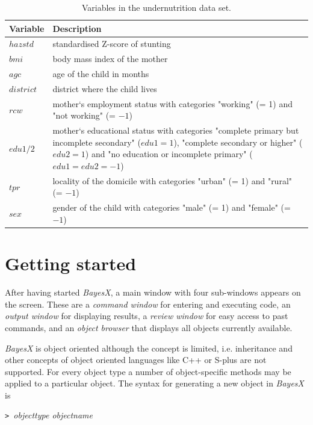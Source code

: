 \documentclass{article}
\begin{document}
{\footnotesize
\begin{table}[ht]
\begin{center}
\begin{tabular}{|l|p{12.5cm}|}
 \hline
 {\bf Variable} & {\bf Description}\\
 \hline
 $hazstd$ & standardised Z-score of stunting\\
 $bmi$ & body mass index of the mother\\
 $agc$ & age of the child in months\\
 $district$ & district where the child lives\\
 $rcw$ & mother`s employment status with categories "working" (= 1) and "not working" (= $-1$)\\
 $edu1/2$ & mother`s educational status with categories "complete primary but incomplete secondary" ($edu1=1$), "complete secondary or higher" ($edu2=1$) and "no education or incomplete primary" ($edu1=edu2=-1$)\\
 $tpr$ & locality of the domicile with categories "urban" (= 1) and "rural" (= $-1$)\\
 $sex$ & gender of the child with categories "male" (= 1) and
 "female" (= $-1$)\\
 \hline
\end{tabular}
{\it\caption{Variables in the undernutrition data set.
\label{zambiavar}}}
\end{center}
\end{table}}

\section{Getting started}\label{usage}

After having started {\em BayesX}, a main window with four
sub-windows appears on the screen. These are a {\em command
window} for entering and executing code, an {\em output window}
for displaying results, a {\em review window} for easy access to
past commands, and an {\em object browser} that displays all
objects currently available.

{\em BayesX} is object oriented although the concept is limited,
i.e. inheritance and other concepts of object oriented languages
like C++ or S-plus are not supported. For every object type a
number of object-specific methods may be applied to a particular
object. The syntax for generating a new object in {\em BayesX} is
\medskip

{\tt> }{\em objecttype objectname}
\medskip
\end{document}
